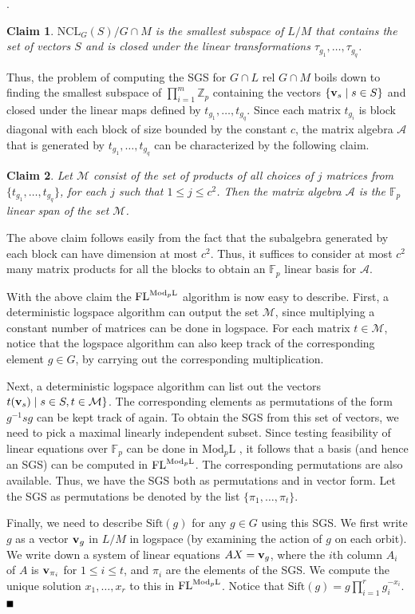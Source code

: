 \documentclass[11pt]{article}
\newtheorem*{claim}{Claim}
\newcommand{\bproof}{\noindent{\it Proof}}
\newcommand{\eproof}{\hspace*{\fill}$\rule{2mm}{2mm}$~~~~~\bigskip}
\renewenvironment{proof}{\bproof. }{\eproof}
\newcommand{\Mod}[1]{\ensuremath{\mathrm{Mod}_{#1}\mathrm{L}}}
\newcommand{\FL}{\mbox{\rm FL}}
\newcommand{\Sift}[1]{\ensuremath{\mathrm{Sift}({#1})}}
\newcommand{\NCL}[2]{\ensuremath{\mathrm{NCL}_{#1}({#2})}}
\newcommand{\Z}{\mathbb{Z}}
\newcommand{\F}{\ensuremath{\mathbb{F}}}
\renewcommand{\v}{\mbox{\bf v}}
\begin{document}
\begin{proof}
\begin{claim}
$\NCL{G}{S}/G\cap M$ is the smallest subspace of $L/M$ that contains
the set of vectors $S$ and is closed under the linear transformations
$\tau_{g_1},\ldots,\tau_{g_q}$.
\end{claim}

Thus, the problem of computing the SGS for $G\cap L$ rel $G\cap M$
boils down to finding the smallest subspace of $\prod_{i=1}^m \Z_p$
containing the vectors $\{\v_s\mid s\in S\}$ and closed under the
linear maps defined by $t_{g_1},\ldots,t_{g_q}$. Since each matrix
$t_{g_i}$ is block diagonal with each block of size bounded by the
constant $c$, the matrix algebra $\mathcal{A}$ that is generated by
$t_{g_1},\ldots,t_{g_q}$ can be characterized by the following claim.

\begin{claim}
Let $\mathcal{M}$ consist of the set of products of all choices of $j$
matrices from $\{t_{g_1},\ldots,t_{g_q}\}$, for each $j$ such that
$1\leq j\leq c^2$. Then the matrix algebra $\mathcal{A}$ is the
$\F_p$ linear span of the set $\mathcal{M}$.
\end{claim}

The above claim follows easily from the fact that the subalgebra
generated by each block can have dimension at most $c^2$. Thus, it
suffices to consider at most $c^2$ many matrix products for all the
blocks to obtain an $\F_p$ linear basis for $\mathcal{A}$.

With the above claim the $\FL^{\Mod{p}}$ algorithm is now easy to
describe. First, a deterministic logspace algorithm can output the set
$\mathcal{M}$, since multiplying a constant number of matrices can be
done in logspace. For each matrix $t\in\mathcal{M}$, notice that the
logspace algorithm can also keep track of the corresponding element
$g\in G$, by carrying out the corresponding multiplication.

Next, a deterministic logspace algorithm can list out the vectors
$t(\v_s)\mid s\in S, t\in\mathcal{M}\}$. The corresponding elements as
permutations of the form $g^{-1}sg$ can be kept track of again. To
obtain the SGS from this set of vectors, we need to pick a maximal
linearly independent subset. Since testing feasibility of linear
equations over $\F_p$ can be done in $\Mod{p}$
\cite{allender99complexity}, it follows that a basis (and hence an
SGS) can be computed in $\FL^{\Mod{p}}$. The corresponding
permutations are also available. Thus, we have the SGS both as
permutations and in vector form. Let the SGS as permutations be
denoted by the list $\{\pi_1,\ldots,\pi_t\}$.

Finally, we need to describe $\Sift{g}$ for any $g\in G$ using this
SGS. We first write $g$ as a vector $\v_g$ in $L/M$ in logspace (by
examining the action of $g$ on each orbit). We write down a system of
linear equations $AX=\v_g$, where the $i$th column $A_i$ of $A$ is
$\v_{\pi_i}$ for $1\leq i\leq t$, and $\pi_i$ are the elements of the
SGS. We compute the unique solution $x_1,\ldots,x_r$ to this in
$\FL^{\Mod{p}}$. Notice that $\Sift{g}=g\prod_{i=1}^r g_i^{-x_i}$.
\end{proof}
\end{document}
